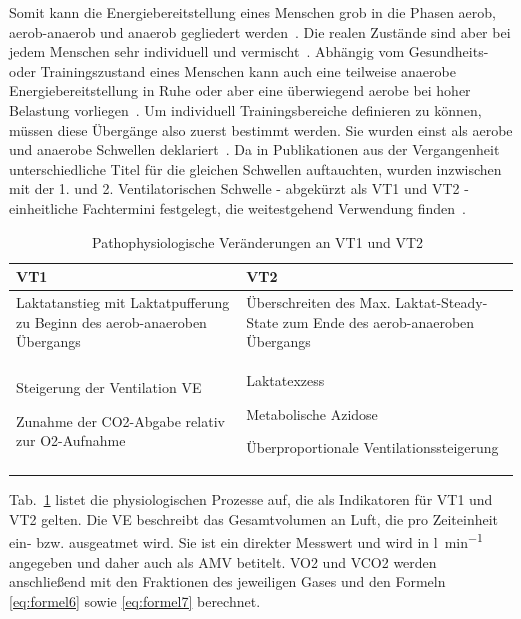 Somit kann die Energiebereitstellung eines Menschen grob in die Phasen aerob, aerob-anaerob und anaerob gegliedert werden~\cite{Antonutto.1995}. Die realen Zustände sind aber bei jedem Menschen sehr individuell und vermischt~\cite{Moosburger.1995}. Abhängig vom Gesundheits- oder Trainingszustand eines Menschen kann auch eine teilweise anaerobe Energiebereitstellung in Ruhe oder aber eine überwiegend aerobe bei hoher Belastung vorliegen~\cite{Skinner.1980}. Um individuell Trainingsbereiche definieren zu können, müssen diese Übergänge also zuerst bestimmt werden. Sie wurden einst als aerobe und anaerobe Schwellen deklariert~\cite{Wasserman.1973}. Da in Publikationen aus der Vergangenheit unterschiedliche Titel für die gleichen Schwellen auftauchten, wurden inzwischen mit der 1. und 2. Ventilatorischen Schwelle - abgekürzt als \acs{VT1} und \acs{VT2} - einheitliche Fachtermini festgelegt, die weitestgehend Verwendung finden~\cite{Westhoff.2012}.
\begin{table}[H]
	\centering
	\caption[Pathophysiologische Veränderungen an VT1 und VT2]{Pathophysiologische Veränderungen an VT1 und VT2~\cite{Westhoff.2012}}
	\medskip
	\begin{tabularx}{\textwidth}{X X}
		\toprule
		\textbf{VT1} & \textbf{VT2} \\
		\midrule
		\midrule
		Laktatanstieg mit Laktatpufferung zu Beginn des aerob-anaeroben Übergangs & Überschreiten des Max. Laktat-Steady-State zum Ende des aerob-anaeroben Übergangs \\
		\begin{titemize}
			\item Steigerung der Ventilation \acs{VE}
			\item Zunahme der \acs{CO2}-Abgabe relativ zur \acs{O2}-Aufnahme
		\end{titemize}
		&\begin{titemize}
			\item Laktatexzess
			\item Metabolische Azidose
			\item Überproportionale Ventilationssteigerung
		\end{titemize}\\
		\bottomrule
	\end{tabularx}
	\label{tab:tabelle1}
\end{table}
Tab.~\ref{tab:tabelle1} listet die physiologischen Prozesse auf, die als Indikatoren für VT1 und VT2 gelten. Die \ac{VE} beschreibt das Gesamtvolumen an Luft, die pro Zeiteinheit ein- bzw. ausgeatmet wird. Sie ist ein direkter Messwert und wird in \si{\litre\per\minute} angegeben und daher auch als \ac{AMV} betitelt. \acs{VO2} und \acs{VCO2} werden anschließend mit den Fraktionen des jeweiligen Gases und den Formeln \eqref{eq:formel6} sowie \eqref{eq:formel7} berechnet.

